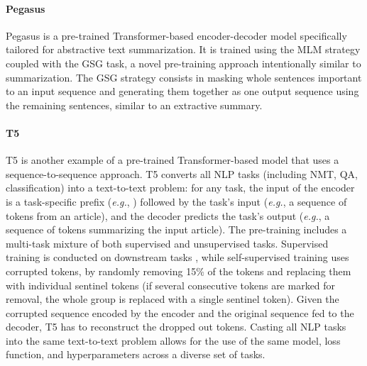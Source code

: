 

\paragraph{Pegasus} 

Pegasus \citep{zhang2020pegasus} is a pre-trained Transformer-based encoder-decoder model specifically tailored for abstractive text summarization. It is trained using the \ac{MLM} strategy coupled with the \ac{GSG} task, a novel pre-training approach intentionally similar to summarization. The \ac{GSG} strategy consists in masking whole sentences important to an input sequence and generating them together as one output sequence using the remaining sentences, similar to an extractive summary. 


\paragraph{T5}

\ac{T5} \citep{raffel2020exploring} is another example of a pre-trained Transformer-based model that uses a sequence-to-sequence approach. \ac{T5} converts all \ac{NLP} tasks (including \ac{NMT}, \ac{QA}, classification) into a text-to-text problem: for any task, the input of the encoder is a task-specific prefix (\textit{e.g.}, ) followed by the task's input (\textit{e.g.}, a sequence of tokens from an article), and the decoder predicts the task's output (\textit{e.g.}, a sequence of tokens summarizing the input article). The pre-training includes a multi-task mixture of both supervised and unsupervised tasks. Supervised training is conducted on downstream tasks \citep{wang2018glue}, while self-supervised training uses corrupted tokens, by randomly removing 15\% of the tokens and replacing them with individual sentinel tokens (if several consecutive tokens are marked for removal, the whole group is replaced with a single sentinel token). Given the corrupted sequence encoded by the encoder and the original sequence fed to the decoder, \ac{T5} has to reconstruct the dropped out tokens. Casting all \ac{NLP} tasks into the same text-to-text problem allows for the use of the same model, loss function, and hyperparameters across a diverse set of tasks. 

